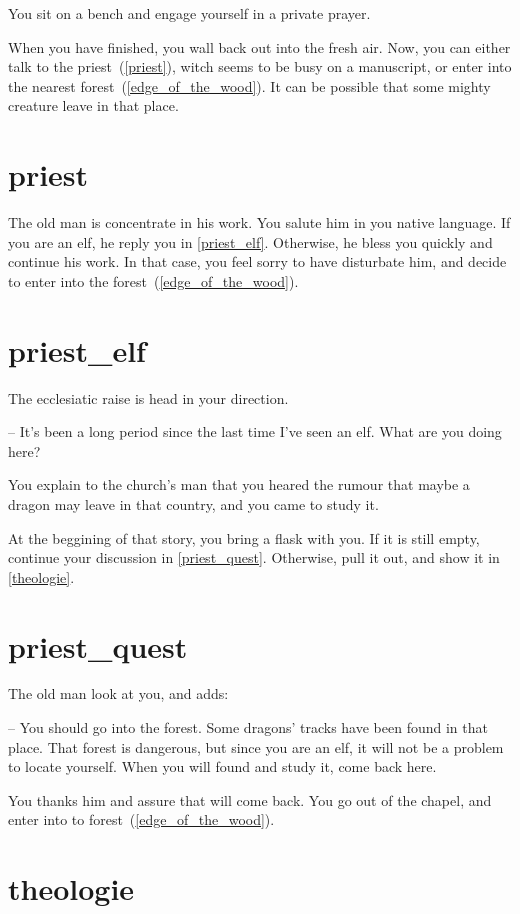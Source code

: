 You sit on a bench and engage yourself in a private prayer.

When you have finished, you wall back out into the fresh air. Now, you can
either talk to the priest~(\ref{priest}), witch seems to be busy on a
manuscript, or enter into the nearest forest~(\ref{edge_of_the_wood}). It can be
possible that some mighty creature leave in that place.

\section{priest}

The old man is concentrate in his work. You salute him in you native language.
If you are an elf, he reply you in \ref{priest_elf}. Otherwise, he bless you
quickly and continue his work. In that case, you feel sorry to have disturbate
him, and decide to enter into the forest~(\ref{edge_of_the_wood}).

\section{priest_elf}

The ecclesiatic raise is head in your direction.

-- It's been a long period since the last time I've seen an elf. What are you
doing here?

You explain to the church's man that you heared the rumour that maybe a dragon
may leave in that country, and you came to study it.

At the beggining of that story, you bring a flask with you. If it is still
empty, continue your discussion in \ref{priest_quest}. Otherwise, pull it out,
and show it in \ref{theologie}.

\section{priest_quest}

The old man look at you, and adds:

-- You should go into the forest. Some dragons' tracks have been found in that
place. That forest is dangerous, but since you are an elf, it will not be a
problem to locate yourself. When you will found and study it, come back here.

You thanks him and assure that will come back. You go out of the chapel, and
enter into to forest~(\ref{edge_of_the_wood}).

\section{theologie}

